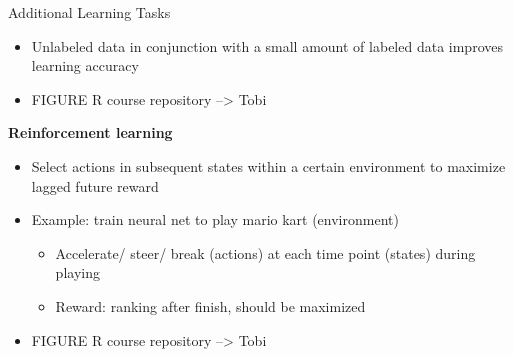 \documentclass[11pt,compress,t,notes=noshow, xcolor=table]{beamer}
\begin{document}
\begin{vbframe}{Additional Learning Tasks}
\begin{itemize}
  \item Unlabeled data in conjunction with a small amount of labeled data 
  improves learning accuracy
  
  \color{red}
  \item FIGURE R course repository --> Tobi
  \color{black}

\end{itemize}

\framebreak

\textbf{Reinforcement learning}

\begin{itemize}

  \item Select actions in subsequent  states within a certain environment to 
  maximize lagged future reward
  
  \item Example: train neural net to play mario kart (environment)
  
  \begin{itemize}
  
    \item Accelerate/ steer/ break (actions) at each time point (states) during 
    playing
    
    \item Reward: ranking after finish, should be maximized
  
  \end{itemize}
  
  \color{red}
  \item FIGURE R course repository --> Tobi
  \color{black}

\end{itemize}

\end{vbframe}


\endlecture
\end{document}
